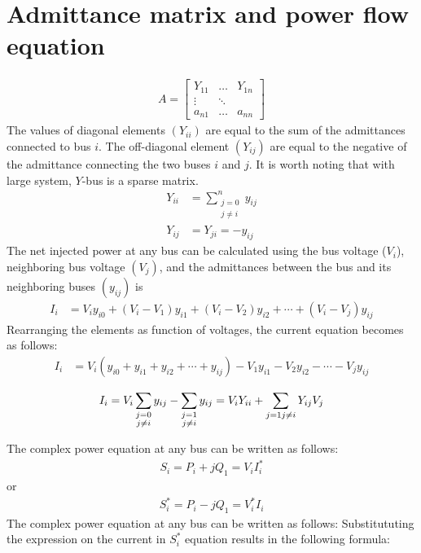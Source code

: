 \documentclass[11pt, oneside, reqno]{amsart}
\numberwithin{equation}{section}
\theoremstyle{plain}%
\theoremstyle{definition}
\theoremstyle{remark}
\begin{document}
\section{Admittance matrix and power flow equation}
\begin{align}
	A = \begin{bmatrix} 
	    Y_{11} & \dots & Y_{1n} \\
	    \vdots & \ddots & \\
	    a_{n1} & \dots & a_{nn} 
	    \end{bmatrix}
\end{align}
The values of diagonal elements $(Y_{ii})$ are equal to the sum of the admittances connected to bus $i$. The off-diagonal element $(Y_{ij})$ are equal to the negative of the admittance connecting the two buses $i$ and $j$. It is worth noting that with large system, $Y$-bus is a sparse matrix.
   \begin{align}
   	Y_{ii}&=\sum^n_{\substack{j=0 \\ j\neq i}}y_{ij}\label{yii}\\
	Y_{ij}&=Y_{ji}=-y_{ij}\label{yij}
   \end{align}
The net injected power at any bus can be calculated using the bus voltage ($V_i$), neighboring bus voltage $(V_j)$, and the admittances between the bus and its neighboring buses $(y_{ij})$ is
\begin{align*}
	I_i &= V_i y_{i0}+(V_i-V_1)y_{i1}
	+(V_i-V_2)y_{i2}+\cdots+(V_i-V_j)y_{ij}
\end{align*}
Rearranging the elements as function of voltages, the current equation becomes as follows:
\begin{align*}
	I_i&=V_i(y_{i0}+y_{i1}+y_{i2}+\cdots+y_{ij})-V_1 y_{i1} - V_2 y_{i2} - \cdots - V_j y_{ij}
\end{align*}


\[
	I_i=V_i\sum_{\substack{j=0 \\ j\neq i}}y_{ij}-\sum_{\substack{j=1 \\ j\neq i}}y_{ij}= V_i Y_{ii}+\sum_{j=1\\ j\neq i}Y_{ij}V_j
\]

The complex power equation at any bus can be written as follows:
\begin{align*}
	S_i=P_i+jQ_1=V_i I^*_i
\end{align*}
or
\begin{align*}
	S^*_i=P_i-jQ_1=V^*_i I_i
\end{align*}
The complex power equation at any bus can be written as follows:
Substitututing the expression on the current in $S^*_i$ equation results in the following formula:
\end{document}

